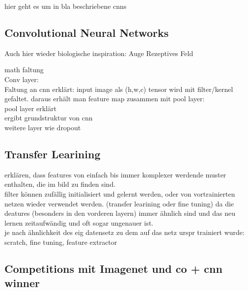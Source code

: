 hier geht es um in bla beschriebene cnns\\


\subsection{Convolutional Neural Networks}


Auch hier wieder biologische inspiration: Auge Rezeptives Feld

math faltung\\


Conv layer:\\
Faltung an cnn erklärt: input image als (h,w,c) tensor wird mit filter/kernel gefaltet. daraus erhält man feature map
zusammen mit pool layer:\\
pool layer erklärt\\

ergibt grundstruktur von cnn\\

weitere layer wie dropout\\

\subsection{Transfer Learining}

erklären, dass features von einfach bis immer komplexer werdende muster enthalten, die im bild zu finden sind.
\\
filter können zufällig initialisiert und gelernt werden, oder von vortrainierten netzen wieder verwendet
werden. (transfer learining oder fine tuning) da die deatures (besonders in den vorderen layern) immer ähnlich sind und das
neu lernen zeitaufwändig und oft sogar ungenauer ist.
\\
je nach ähnlichkeit des eig datensetz zu dem auf das netz urspr trainiert wurde:\\
scratch, fine tuning, feature extractor



\subsection{Competitions mit Imagenet und co + cnn winner}\label{subsec:comp}

